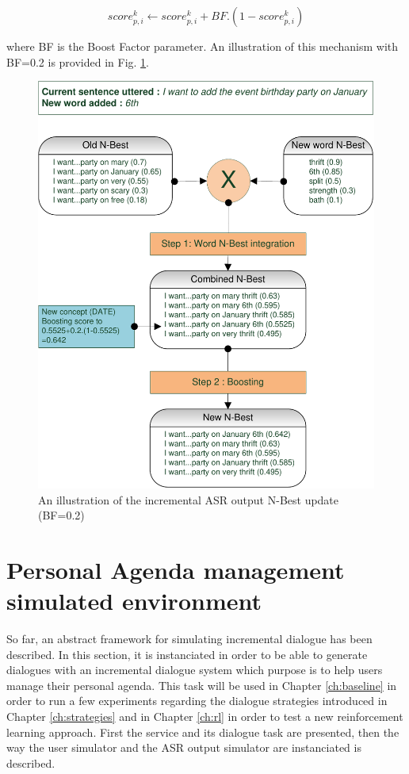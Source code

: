 						$$ score^k_{p,i} \leftarrow score^k_{p,i} + BF.(1 - score^k_{p,i}) $$
							
					where BF is the Boost Factor parameter. An illustration of this mechanism with BF=0.2 is provided in Fig. \ref{fig:asrsimu}.
					
					\begin{figure}[h]
						\centering
						\includegraphics[scale=0.75]{figures/ASRSimu.pdf}
						\caption{An illustration of the incremental ASR output N-Best update (BF=0.2)}
						\label{fig:asrsimu}
					\end{figure}

\section{Personal Agenda management simulated environment}

	So far, an abstract framework for simulating incremental dialogue has been described. In this section, it is instanciated in order to be able to generate dialogues with an incremental dialogue system which purpose is to help users manage their personal agenda. This task will be used in Chapter \ref{ch:baseline} in order to run a few experiments regarding the dialogue strategies introduced in Chapter \ref{ch:strategies} and in Chapter \ref{ch:rl} in order to test a new reinforcement learning approach. First the service and its dialogue task are presented, then the way the user simulator and the ASR output simulator are instanciated is described.
	

